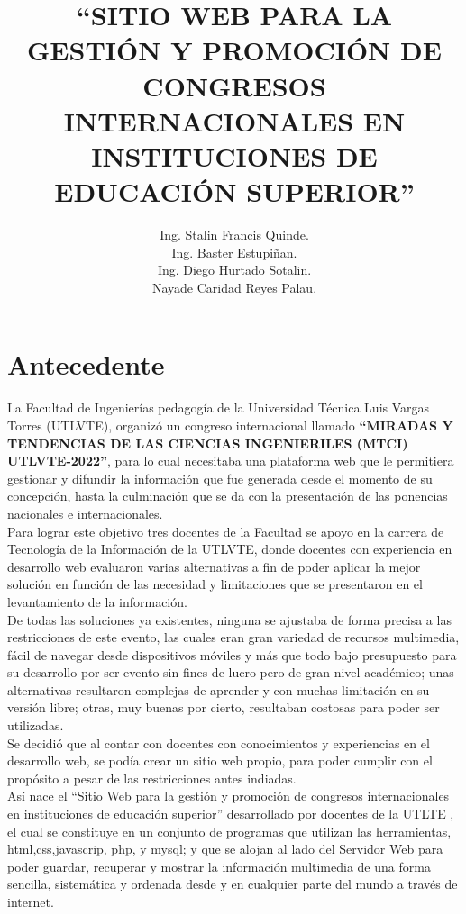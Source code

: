 \documentclass[a4paper,14px]{article}
\title{``SITIO WEB PARA LA GESTIÓN Y PROMOCIÓN DE CONGRESOS INTERNACIONALES EN INSTITUCIONES DE EDUCACIÓN SUPERIOR''}
\author{Ing. Stalin Francis Quinde.\\ Ing. Baster Estupiñan. \\ Ing. Diego Hurtado Sotalin.\\  Nayade Caridad Reyes Palau. }
\begin{document}
\maketitle

\section{Antecedente}
\label{sec:antecedente}
La Facultad de Ingenierías pedagogía de la Universidad Técnica Luis Vargas Torres (UTLVTE), organizó un congreso internacional llamado \textbf{``MIRADAS Y TENDENCIAS  DE LAS CIENCIAS INGENIERILES (MTCI) UTLVTE-2022''}, para lo cual necesitaba una plataforma web que le permitiera gestionar y difundir la información que  fue generada desde el momento de su concepción, hasta la culminación que se da con la presentación de las ponencias nacionales e internacionales.\\

Para lograr este objetivo tres docentes de la Facultad se apoyo en la carrera de Tecnología de la Información de la UTLVTE, donde docentes con experiencia en desarrollo web evaluaron varias alternativas a fin de poder aplicar la mejor solución en función de las necesidad y limitaciones que se presentaron en el levantamiento de la información.\\

De todas las soluciones ya existentes, ninguna se ajustaba de forma precisa a las restricciones de este evento, las cuales eran  gran variedad de recursos multimedia, fácil de navegar desde dispositivos móviles y  más que todo bajo presupuesto para su desarrollo por ser evento sin fines de lucro pero de gran nivel académico; unas alternativas resultaron complejas de aprender y con muchas limitación en su versión libre; otras, muy buenas por cierto, resultaban costosas para poder ser utilizadas.\\

Se decidió que al contar con docentes con conocimientos y experiencias en el desarrollo web,  se podía crear un  sitio web propio, para poder  cumplir con el propósito a pesar de las restricciones antes indiadas.\\

Así nace el  ``Sitio Web para la gestión y promoción de congresos internacionales en instituciones de educación superior'' desarrollado por docentes de la UTLTE , el cual se constituye en un  conjunto de programas que utilizan las  herramientas,  html,css,javascrip, php, y mysql; y que se alojan al lado del Servidor Web para poder guardar, recuperar y mostrar la información multimedia de una forma sencilla, sistemática y ordenada desde y en cualquier parte del mundo a través de internet.\\
\end{document}
